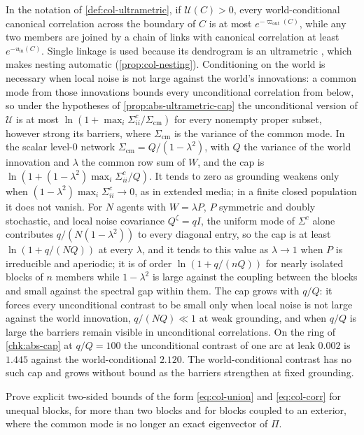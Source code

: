 In the notation of \cref{def:col-ultrametric}, if $\mathcal U(C)>0$, every world-conditional canonical correlation across the boundary of $C$ is at most $e^{-\varpi_{\mathrm{out}}(C)}$, while any two members are joined by a chain of links with canonical correlation at least $e^{-u_{\mathrm{in}}(C)}$. Single linkage is used because its dendrogram is an ultrametric \citep{carlsson2010characterization}, which makes nesting automatic (\cref{prop:col-nesting}). Conditioning on the world is necessary when local noise is not large against the world's innovations: a common mode from those innovations bounds every unconditional correlation from below, so under the hypotheses of \cref{prop:abs-ultrametric-cap} the unconditional version of $\mathcal U$ is at most $\ln(1+\max_i\Sigma^c_{ii}/\Sigma_{\mathrm{cm}})$ for every nonempty proper subset, however strong its barriers, where $\Sigma_{\mathrm{cm}}$ is the variance of the common mode. In the scalar level-0 network $\Sigma_{\mathrm{cm}}=Q/(1-\lambda^2)$, with $Q$ the variance of the world innovation and $\lambda$ the common row sum of $W$, and the cap is $\ln(1+(1-\lambda^2)\max_i\Sigma^c_{ii}/Q)$. It tends to zero as grounding weakens only when $(1-\lambda^2)\max_i\Sigma^c_{ii}\to0$, as in extended media; in a finite closed population it does not vanish. For $N$ agents with $W=\lambda P$, $P$ symmetric and doubly stochastic, and local noise covariance $Q^\zeta=qI$, the uniform mode of $\Sigma^c$ alone contributes $q/(N(1-\lambda^2))$ to every diagonal entry, so the cap is at least $\ln(1+q/(NQ))$ at every $\lambda$, and it tends to this value as $\lambda\to1$ when $P$ is irreducible and aperiodic; it is of order $\ln(1+q/(nQ))$ for nearly isolated blocks of $n$ members while $1-\lambda^2$ is large against the coupling between the blocks and small against the spectral gap within them. The cap grows with $q/Q$: it forces every unconditional contrast to be small only when local noise is not large against the world innovation, $q/(NQ)\ll1$ at weak grounding, and when $q/Q$ is large the barriers remain visible in unconditional correlations. On the ring of \cref{chk:abs-cap} at $q/Q=100$ the unconditional contrast of one arc at leak $0.002$ is $1.445$ against the world-conditional $2.120$. The world-conditional contrast has no such cap and grows without bound as the barriers strengthen at fixed grounding.

\begin{openproblem}\label{open:col-bridge}
Prove explicit two-sided bounds of the form \eqref{eq:col-union} and \eqref{eq:col-corr} for unequal blocks, for more than two blocks and for blocks coupled to an exterior, where the common mode is no longer an exact eigenvector of $\Pi$.
\end{openproblem}
